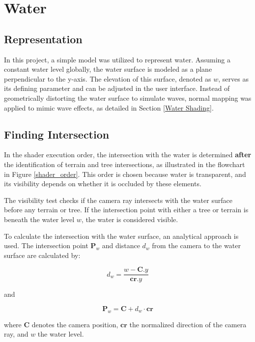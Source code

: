 \section{Water}

\subsection{Representation}

In this project, a simple model was utilized to represent water. Assuming a constant water level globally, the water surface is modeled as a plane perpendicular to the y-axis. The elevation of this surface, denoted as $w$, serves as its defining parameter and can be adjusted in the user interface. Instead of geometrically distorting the water surface to simulate waves, normal mapping was applied to mimic wave effects, as detailed in Section \ref{Water Shading}.

\subsection{Finding Intersection}

In the shader execution order, the intersection with the water is determined \textbf{after} the identification of terrain and tree intersections, as illustrated in the flowchart in Figure \ref{shader_order}. This order is chosen because water is transparent, and its visibility depends on whether it is occluded by these elements.

The visibility test checks if the camera ray intersects with the water surface before any terrain or tree. If the intersection point with either a tree or terrain is beneath the water level $w$, the water is considered visible.

To calculate the intersection with the water surface, an analytical approach is used. The intersection point $\mathbf{P}_w$ and distance $d_w$ from the camera to the water surface are calculated by:

\begin{equation}
d_{w} = \frac{w - \mathbf{C}.y}{\mathbf{cr}.y}
\end{equation}

and

\begin{equation}
\mathbf{P}_{w} = \mathbf{C} + d_{w}\cdot\mathbf{cr}
\end{equation}

where $\mathbf{C}$ denotes the camera position, $\mathbf{cr}$ the normalized direction of the camera ray, and $w$ the water level.

